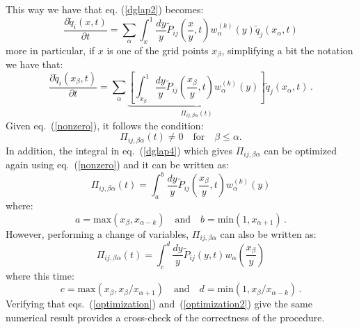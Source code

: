 \documentclass[10pt,a4paper]{article}
\begin{document}
This way we have that eq. (\ref{dglap2}) becomes:
\begin{equation}
\frac{\partial \tilde{q}_{i}(x,t)}{\partial
  t}=\sum_{\alpha}\int^{1}_{x}\frac{dy}y
\tilde{P}_{ij}\left(\frac{x}{y},t\right)w_{\alpha}^{(k)}(y)\tilde{q}_{j}(x_{\alpha},t)
\label{dglap3}
\end{equation}
more in particular, if $x$ is one of the grid points $x_\beta$, simplifying a bit the notation we have that:
\begin{equation}
\frac{\partial \tilde{q}_{i}(x_\beta,t)}{\partial
  t}=\sum_{\alpha}\underbrace{\left[\int^{1}_{x_\beta}\frac{dy}y
    \tilde{P}_{ij}\left(\frac{x_\beta}{y},t\right)w_{\alpha}^{(k)}(y)\right]}_{\Pi_{ij,\beta\alpha}(t)}\tilde{q}_{j}(x_{\alpha},t)\,.
\label{dglap4}
\end{equation}
Given eq.~(\ref{nonzero}), it follows the condition:
\begin{equation}
\Pi_{ij,\beta\alpha}(t) \neq 0 \quad\mbox{for}\quad \beta \leq \alpha.  
\label{nonzero2}
\end{equation}
In addition, the integral in eq.~(\ref{dglap4}) which gives $\Pi_{ij,\beta\alpha}$ can be optimized again using eq.~(\ref{nonzero}) and it can be written as:
\begin{equation}
\Pi_{ij,\beta\alpha}(t) = \int^{b}_{a}\frac{dy}y
\tilde{P}_{ij}\left(\frac{x_\beta}{y},t\right)w_{\alpha}^{(k)}(y)
\label{optimization}
\end{equation}
where:
\begin{equation}
a =  \mbox{max}(x_\beta,x_{\alpha-k})\quad\mbox{and}\quad b = \mbox{min}(1,x_{\alpha+1})\,.
\end{equation}
However, performing a change of variables, $\Pi_{ij,\beta\alpha}$ can also be written as:
\begin{equation}
\Pi_{ij,\beta\alpha}(t) = \int^{d}_{c}\frac{dy}y
\tilde{P}_{ij}(y,t)w_{\alpha}\left(\frac{x_\beta}{y}\right)
\label{optimization2}
\end{equation}
where this time:
\begin{equation}
c =  \mbox{max}(x_\beta,x_\beta/x_{\alpha+1}) \quad\mbox{and}\quad d =
\mbox{min}(1,x_\beta/x_{\alpha-k}) \,.
\label{bounds2}
\end{equation}
Verifying that eqs.~(\ref{optimization}) and~(\ref{optimization2}) give the same numerical result provides a cross-check of the correctness of the procedure.
\end{document}
